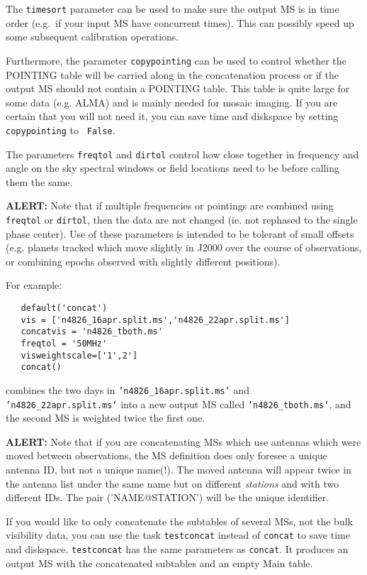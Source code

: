 The {\tt timesort} parameter can be used to make sure the output
MS is in time order (e.g.\ if your input MS have concurrent times).
This can possibly speed up some subsequent calibration operations.

Furthermore, the parameter {\tt copypointing} can be used to control
whether the POINTING table will be carried along in the concatenation
process or if the output MS should not contain a POINTING table. This
table is quite large for some data (e.g. ALMA) and is mainly needed
for mosaic imaging.  If you are certain that you will not need it, you
can save time and diskspace by setting {\tt copypointing} to {\tt
  False}.

The parameters {\tt freqtol} and {\tt dirtol} control how close
together in frequency and angle on the sky spectral windows or field
locations need to be before calling them the same.

{\bf ALERT:} Note that if multiple frequencies or pointings are
combined using {\tt freqtol} or {\tt dirtol}, then the data are not
changed (ie. not rephased to the single phase center).  Use of these 
parameters is intended to be tolerant of small offsets (e.g. planets
tracked which move slightly in J2000 over the course of observations,
or combining epochs observed with slightly different positions).

For example:
\small
\begin{verbatim}
   default('concat')
   vis = ['n4826_16apr.split.ms','n4826_22apr.split.ms']
   concatvis = 'n4826_tboth.ms'
   freqtol = '50MHz'
   visweightscale=['1',2']
   concat()
\end{verbatim}
\normalsize
combines the two days in {\tt 'n4826\_16apr.split.ms'} and
{\tt 'n4826\_22apr.split.ms'} into a new output MS called
{\tt 'n4826\_tboth.ms'}, and the second MS is weighted twice the first one.


{\bf ALERT:} Note that if you are concatenating MSs which use
antennas which were moved between observations, the MS definition 
does only foresee a unique antenna ID, but not a unique name(!). 
The moved antenna will
appear twice in the antenna list under the same name but on different
{\it stations} and with two different IDs. The pair ('NAME@STATION')
will be the unique identifier.

If you would like to only concatenate the subtables of several 
MSs, not the bulk visibility data, you can use the task {\tt testconcat}
instead of {\tt concat} to save time and diskspace. {\tt testconcat} has
the same parameters as {\tt concat}. It produces an output MS with
the concatenated subtables and an empty Main table.


